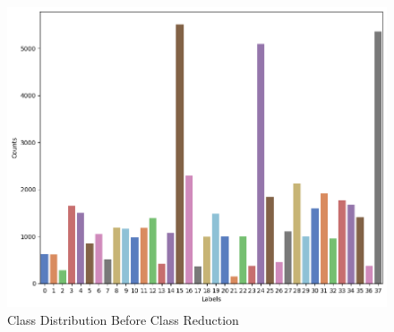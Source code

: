     \begin{figure}
        \includegraphics[width=1\linewidth]{graphics//chapter 4/38 class distribution.png}
        \caption{Class Distribution Before Class Reduction}
        \label{Class Distribution Before Class Reduction}
    \end{figure}

